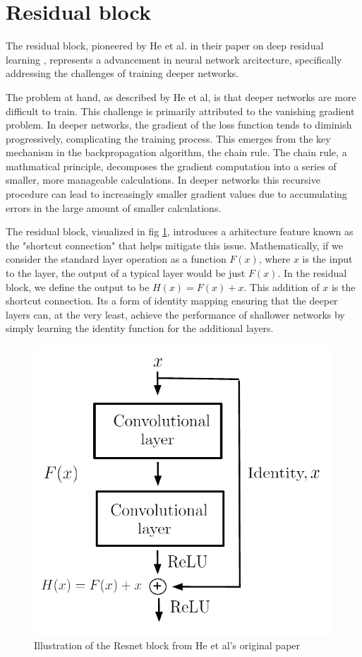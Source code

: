 \section{Residual block}
The residual block, pioneered by He et al. in their paper on deep residual learning \cite{ResLearn}, represents a advancement in neural network arcitecture, 
specifically addressing the challenges of training deeper networks.

The problem at hand, as described by He et al, is that deeper networks are more difficult to train. This challenge is primarily attributed to the vanishing gradient problem.
In deeper networks, the gradient of the loss function tends to diminish progressively, complicating the training process. 
This emerges from the key mechanism in the backpropagation algorithm, the chain rule. The chain rule, a mathmatical principle, decomposes the gradient computation into a series of smaller,
more manageable calculations. In deeper networks this recursive procedure can lead to increasingly smaller gradient values due to accumulating errors in the large amount of smaller calculations. 

The residual block, visualized in fig \ref{fig:resblock}, introduces a arhitecture feature known as the "shortcut connection" that helps mitigate this issue.
Mathematically, if we consider the standard layer operation as a function $F(x)$, where $x$ is the input to the layer, the output of a typical layer would be just $F(x)$. In the residual block,
we define the output to be $H(x) = F(x) + x$. This addition of $x$ is the shortcut connection. Its a form of identity mapping ensuring that the deeper layers can, at the very least, achieve the performance of shallower
networks by simply learning the identity function for the additional layers.

\begin{figure}[H]
    \includegraphics[scale=0.6]{figures/figure-pdf/Resnet.pdf}
    \caption{Illustration of the Resnet block from He et al's original paper\cite{ResLearn} }
    \label{fig:resblock}
\end{figure}

